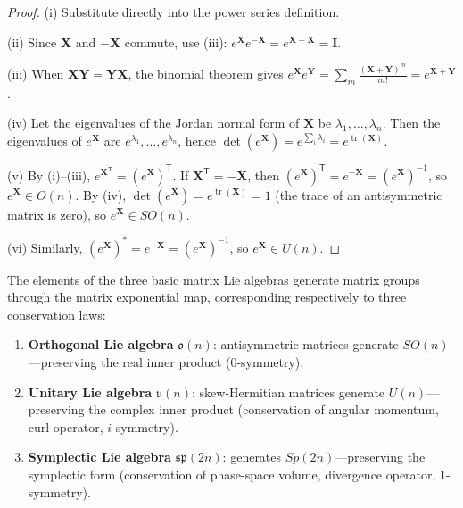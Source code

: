 \begin{proof}
(i) Substitute directly into the power series definition.

(ii) Since $\mathbf{X}$ and $-\mathbf{X}$ commute, use (iii): $e^{\mathbf{X}} e^{-\mathbf{X}} = e^{\mathbf{X}-\mathbf{X}} = \mathbf{I}$.

(iii) When $\mathbf{XY} = \mathbf{YX}$, the binomial theorem gives $e^{\mathbf{X}} e^{\mathbf{Y}} = \sum_{m} \frac{(\mathbf{X}+\mathbf{Y})^m}{m!} = e^{\mathbf{X}+\mathbf{Y}}$.

(iv) Let the eigenvalues of the Jordan normal form of $\mathbf{X}$ be $\lambda_1, \dots, \lambda_n$. Then the eigenvalues of $e^{\mathbf{X}}$ are $e^{\lambda_1}, \dots, e^{\lambda_n}$, hence $\det(e^{\mathbf{X}}) = e^{\sum_i \lambda_i} = e^{\operatorname{tr}(\mathbf{X})}$.

(v) By (i)--(iii), $e^{\mathbf{X}^{\mathsf T}} = (e^{\mathbf{X}})^{\mathsf T}$. If $\mathbf{X}^{\mathsf T} = -\mathbf{X}$, then $(e^{\mathbf{X}})^{\mathsf T} = e^{-\mathbf{X}} = (e^{\mathbf{X}})^{-1}$, so $e^{\mathbf{X}} \in O(n)$. By (iv), $\det(e^{\mathbf{X}}) = e^{\operatorname{tr}(\mathbf{X})} = 1$ (the trace of an antisymmetric matrix is zero), so $e^{\mathbf{X}} \in SO(n)$.

(vi) Similarly, $(e^{\mathbf{X}})^* = e^{-\mathbf{X}} = (e^{\mathbf{X}})^{-1}$, so $e^{\mathbf{X}} \in U(n)$.
\end{proof}

\begin{theorem}\label{thm:lie_algebra_conservation}
The elements of the three basic matrix Lie algebras generate matrix groups through the matrix exponential map, corresponding respectively to three conservation laws:
\begin{enumerate}[label=(\roman*)]
    \item \textbf{Orthogonal Lie algebra} $\mathfrak{o}(n)$: antisymmetric matrices generate $SO(n)$---preserving the real inner product ($0$-symmetry).
    \item \textbf{Unitary Lie algebra} $\mathfrak{u}(n)$: skew-Hermitian matrices generate $U(n)$---preserving the complex inner product (conservation of angular momentum, curl operator, $i$-symmetry).
    \item \textbf{Symplectic Lie algebra} $\mathfrak{sp}(2n)$: generates $Sp(2n)$---preserving the symplectic form (conservation of phase-space volume, divergence operator, $1$-symmetry).
\end{enumerate}
\end{theorem}

